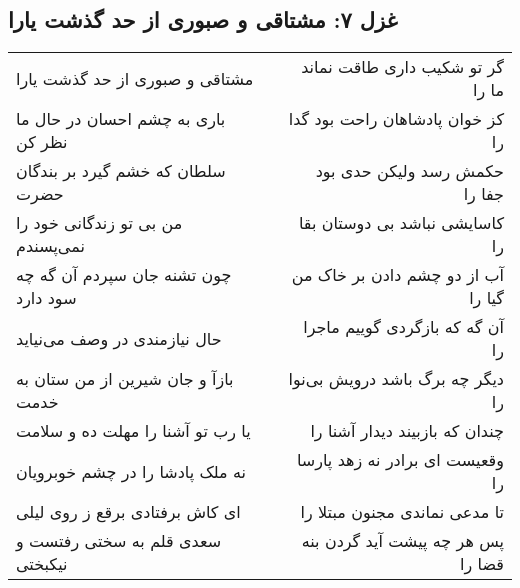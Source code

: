 \begin{center}
\section*{غزل ۷: مشتاقی و صبوری از حد گذشت یارا}
\label{sec:007}
\begin{longtable}{l p{0.5cm} r}
مشتاقی و صبوری از حد گذشت یارا
&&
گر تو شکیب داری طاقت نماند ما را
\\
باری به چشم احسان در حال ما نظر کن
&&
کز خوان پادشاهان راحت بود گدا را
\\
سلطان که خشم گیرد بر بندگان حضرت
&&
حکمش رسد ولیکن حدی بود جفا را
\\
من بی تو زندگانی خود را نمی‌پسندم
&&
کاسایشی نباشد بی دوستان بقا را
\\
چون تشنه جان سپردم آن گه چه سود دارد
&&
آب از دو چشم دادن بر خاک من گیا را
\\
حال نیازمندی در وصف می‌نیاید
&&
آن گه که بازگردی گوییم ماجرا را
\\
بازآ و جان شیرین از من ستان به خدمت
&&
دیگر چه برگ باشد درویش بی‌نوا را
\\
یا رب تو آشنا را مهلت ده و سلامت
&&
چندان که بازبیند دیدار آشنا را
\\
نه ملک پادشا را در چشم خوبرویان
&&
وقعیست ای برادر نه زهد پارسا را
\\
ای کاش برفتادی برقع ز روی لیلی
&&
تا مدعی نماندی مجنون مبتلا را
\\
سعدی قلم به سختی رفتست و نیکبختی
&&
پس هر چه پیشت آید گردن بنه قضا را
\\
\end{longtable}
\end{center}
